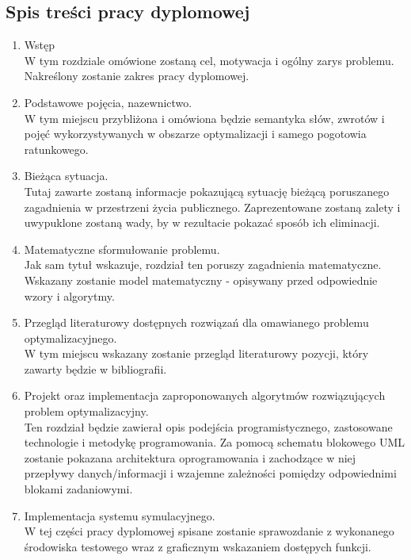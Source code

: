 \documentclass[12pt]{article} %
\begin{document}
\subsection{Spis treści pracy dyplomowej}

\begin{enumerate}
\item Wstęp\\
W tym rozdziale omówione zostaną cel, motywacja i ogólny zarys problemu. Nakreślony zostanie zakres pracy dyplomowej.

\item Podstawowe pojęcia, nazewnictwo.\\
W tym miejscu przybliżona i omówiona będzie semantyka słów, zwrotów i pojęć wykorzystywanych w obszarze optymalizacji i samego pogotowia ratunkowego.

\item Bieżąca sytuacja.\\
Tutaj zawarte zostaną informacje pokazującą sytuację bieżącą poruszanego zagadnienia w przestrzeni życia publicznego. Zaprezentowane zostaną zalety i uwypuklone zostaną wady, by w rezultacie pokazać sposób ich eliminacji.

\item Matematyczne sformułowanie problemu.\\
Jak sam tytuł wskazuje, rozdział ten poruszy zagadnienia matematyczne. Wskazany zostanie model matematyczny - opisywany przed odpowiednie wzory i algorytmy.

\item Przegląd literaturowy dostępnych rozwiązań dla omawianego problemu optymalizacyjnego.\\
W tym miejscu wskazany zostanie przegląd literaturowy pozycji, który zawarty będzie w bibliografii. 

\item Projekt oraz implementacja zaproponowanych algorytmów rozwiązujących problem optymalizacyjny.\\
Ten rozdział będzie zawierał opis podejścia programistycznego, zastosowane technologie i metodykę programowania. Za pomocą schematu blokowego UML zostanie pokazana architektura oprogramowania i zachodzące w niej przepływy danych/informacji i wzajemne zależności pomiędzy odpowiednimi blokami zadaniowymi.

\item Implementacja systemu symulacyjnego.\\
W tej części pracy dyplomowej spisane zostanie sprawozdanie z wykonanego środowiska testowego wraz z graficznym wskazaniem dostępych funkcji.


\end{enumerate}
\end{document}
